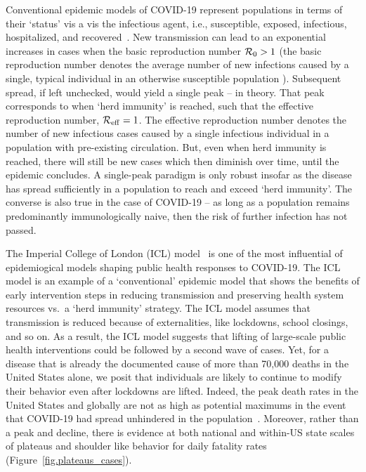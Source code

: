 Conventional epidemic
models of COVID-19 represent populations in terms of their `status' vis
a vis the infectious agent, i.e., susceptible, exposed, infectious,
hospitalized, and recovered~\citep{ferguson2020report,kucharski2020early,kissler_medrxiv2020,park_medrxiv2020,kraemer_2020sci,li_science2020,wu_2020natmed}.
New transmission can lead to an exponential increases in cases 
when the basic reproduction number ${\cal{R}}_0>1$ (the
basic reproduction number denotes the average number of new
infections caused by a single, typical individual in an otherwise
susceptible population \citep{anderson1991infectious}).  Subsequent
spread, if left unchecked, would yield a single peak -- in theory. That 
peak corresponds to when `herd immunity' is reached, such
that the effective reproduction number, ${\cal{R}}_{\mathrm{eff}}=1$.
The effective reproduction number denotes the number of new
infectious cases caused by a single infectious individual
in a population with pre-existing circulation.
But, even when herd immunity is reached, there will still be new cases 
which then diminish over time, until the epidemic concludes.  
A single-peak paradigm is
only robust insofar as the disease has spread
sufficiently in a population to reach and exceed `herd immunity'.
The converse
is also true in the case of COVID-19 -- as long as 
a population remains predominantly immunologically
naive, then the risk of further infection has not passed. 

The Imperial College of London (ICL) model~\citep{ferguson2020report} is
one of the most influential of 
epidemiogical models shaping public health responses to COVID-19. The ICL model is an
example of a `conventional' epidemic model
that shows the benefits of  early intervention steps in reducing
transmission and preserving health system resources vs.~a `herd immunity' strategy.  
The ICL model assumes that
transmission is reduced because of externalities, like lockdowns,
school closings, and so on.  
As a result, the ICL model suggests that lifting of large-scale
public health interventions could be followed by a second wave of cases.
Yet, for a disease
that is already the documented cause of more than 70,000 deaths
in the United States alone, we posit that individuals
are likely to continue to modify
their behavior even after lockdowns are lifted.  
Indeed, the peak death rates in the United States and globally
are not as high as potential maximums in the event that
COVID-19 had spread unhindered in the population~\citep{ferguson2020report}. 
Moreover, rather than a peak and decline, there is evidence at both national
and within-US state scales of plateaus and shoulder like
behavior for daily fatality rates (Figure~\ref{fig.plateaus_cases}).   

